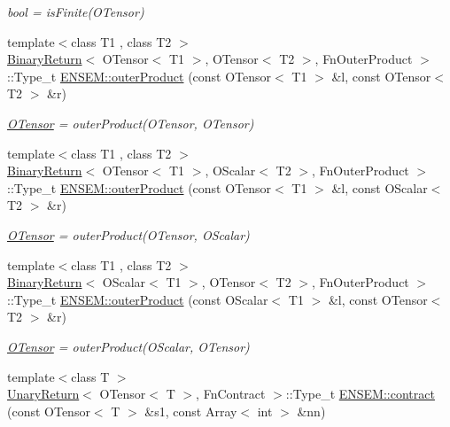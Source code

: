 \begin{DoxyCompactItemize}
\begin{DoxyCompactList}\small\item\em bool = is\+Finite(\+O\+Tensor) \end{DoxyCompactList}\item 
{\footnotesize template$<$class T1 , class T2 $>$ }\\\mbox{\hyperlink{structBinaryReturn}{Binary\+Return}}$<$ O\+Tensor$<$ T1 $>$, O\+Tensor$<$ T2 $>$, Fn\+Outer\+Product $>$\+::Type\+\_\+t \mbox{\hyperlink{group__obstensor_ga89521e9a934b14066eac700fe2539b53}{E\+N\+S\+E\+M\+::outer\+Product}} (const O\+Tensor$<$ T1 $>$ \&l, const O\+Tensor$<$ T2 $>$ \&r)
\begin{DoxyCompactList}\small\item\em \mbox{\hyperlink{classENSEM_1_1OTensor}{O\+Tensor}} = outer\+Product(\+O\+Tensor, O\+Tensor) \end{DoxyCompactList}\item 
{\footnotesize template$<$class T1 , class T2 $>$ }\\\mbox{\hyperlink{structBinaryReturn}{Binary\+Return}}$<$ O\+Tensor$<$ T1 $>$, O\+Scalar$<$ T2 $>$, Fn\+Outer\+Product $>$\+::Type\+\_\+t \mbox{\hyperlink{group__obstensor_ga2f3f321adaac09837bf726a64c539c11}{E\+N\+S\+E\+M\+::outer\+Product}} (const O\+Tensor$<$ T1 $>$ \&l, const O\+Scalar$<$ T2 $>$ \&r)
\begin{DoxyCompactList}\small\item\em \mbox{\hyperlink{classENSEM_1_1OTensor}{O\+Tensor}} = outer\+Product(\+O\+Tensor, O\+Scalar) \end{DoxyCompactList}\item 
{\footnotesize template$<$class T1 , class T2 $>$ }\\\mbox{\hyperlink{structBinaryReturn}{Binary\+Return}}$<$ O\+Scalar$<$ T1 $>$, O\+Tensor$<$ T2 $>$, Fn\+Outer\+Product $>$\+::Type\+\_\+t \mbox{\hyperlink{group__obstensor_ga4b391fbdb7626ccda42a2068c3ff5ba2}{E\+N\+S\+E\+M\+::outer\+Product}} (const O\+Scalar$<$ T1 $>$ \&l, const O\+Tensor$<$ T2 $>$ \&r)
\begin{DoxyCompactList}\small\item\em \mbox{\hyperlink{classENSEM_1_1OTensor}{O\+Tensor}} = outer\+Product(\+O\+Scalar, O\+Tensor) \end{DoxyCompactList}\item 
{\footnotesize template$<$class T $>$ }\\\mbox{\hyperlink{structUnaryReturn}{Unary\+Return}}$<$ O\+Tensor$<$ T $>$, Fn\+Contract $>$\+::Type\+\_\+t \mbox{\hyperlink{group__obstensor_ga2c9ce6b1bd52f861eb3ec96cee9d6334}{E\+N\+S\+E\+M\+::contract}} (const O\+Tensor$<$ T $>$ \&s1, const Array$<$ int $>$ \&nn)

\end{DoxyCompactItemize}
